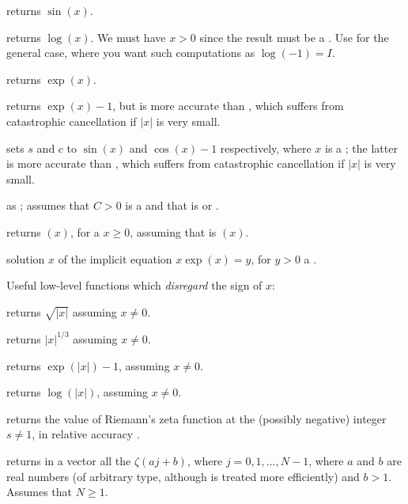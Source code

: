  returns $\sin(x)$.

 returns $\log(x)$. We must have $x > 0$
since the result must be a . Use  for the general case,
where you want such computations as $\log(-1) = I$.

 returns $\exp(x)$.

 returns $\exp(x)-1$, but is more accurate than
, which suffers from catastrophic cancellation if
$|x|$ is very small.

 sets $s$ and $c$ to
$\sin(x)$ and $\cos(x)-1$ respectively, where $x$ is a ; the latter
is more accurate than , which suffers from
catastrophic cancellation if $|x|$ is very small.

 as ; assumes
that $C > 0$ is a  and that  is  or .

 returns $(x)$, for a 
$x\geq 0$, assuming that  is $(x)$.

 solution $x$ of the implicit equation
$x \exp(x) = y$, for $y > 0$ a .

\noindent Useful low-level functions which \emph{disregard} the sign of $x$:

 returns $\sqrt{|x|}$ assuming $x\neq 0$.

 returns $|x|^{1/3}$ assuming $x\neq 0$.

 returns $\exp(|x|) - 1$, assuming $x \neq 0$.

 returns $\log(|x|)$, assuming $x \neq 0$.


 returns the value of Riemann's zeta
function at the (possibly negative) integer $s\neq 1$, in relative accuracy
.

 returns in a vector
all the $\zeta(aj + b)$, where $j = 0, 1, \dots, N-1$, where $a$ and $b$ are
real numbers (of arbitrary type, although  is treated more
efficiently) and $b > 1$. Assumes that $N \geq 1$.

